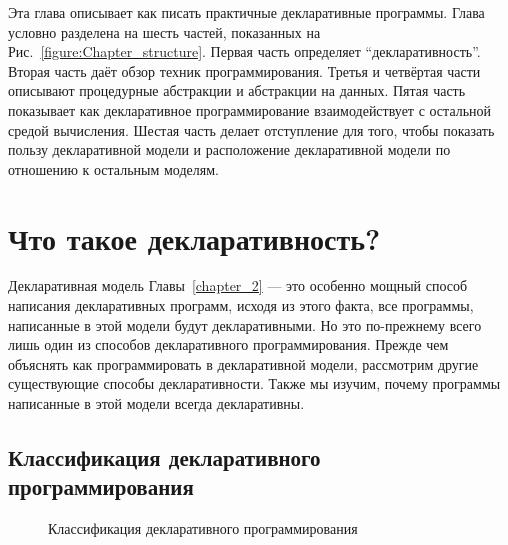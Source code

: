 Эта глава описывает как писать практичные декларативные программы. Глава условно разделена на шесть частей, показанных на Рис.~\ref{figure:Chapter_structure}. Первая часть определяет ``декларативность''. Вторая часть даёт обзор техник программирования. Третья и четвёртая части описывают процедурные абстракции и абстракции на данных. Пятая часть показывает как декларативное программирование взаимодействует с остальной средой вычисления. Шестая часть делает отступление для того, чтобы показать пользу декларативной модели и расположение декларативной модели по отношению к остальным моделям.

\section{Что такое декларативность?}

Декларативная модель Главы~\ref{chapter_2} --- это особенно мощный способ написания декларативных программ, исходя из этого факта, все программы, написанные в этой модели будут декларативными. Но это по-прежнему всего лишь один из способов декларативного программирования. Прежде чем объяснять как программировать в декларативной модели, рассмотрим другие существующие способы декларативности. Также мы изучим, почему программы написанные в этой модели всегда декларативны.

\subsection{Классификация декларативного программирования}

\begin{figure}
  \caption{Классификация декларативного программирования}
  \label{figure:Declarative_programming_classification}
\end{figure}

